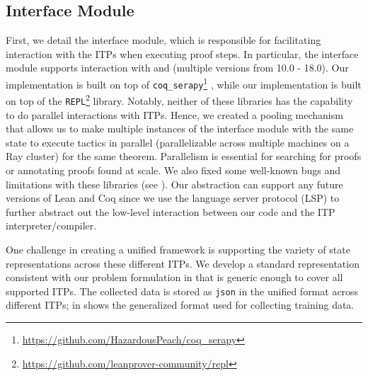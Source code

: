 \subsection{Interface Module}
\label{sec:interface-module}
First, we detail the interface module, which is responsible for facilitating interaction with the ITPs when executing proof steps. In particular, the interface module supports interaction with \lean{} and \coq\;(multiple versions from 10.0 - 18.0). Our \coq\; implementation is built on top of \texttt{coq\_serapy}\footnote{\href{https://github.com/HazardousPeach/coq\_serapy}{https://github.com/HazardousPeach/coq\_serapy}} \citep{sanchez2020generating}, while our \lean{} implementation is built on top of the \texttt{REPL}\footnote{\href{https://github.com/leanprover-community/repl}{https://github.com/leanprover-community/repl}} library. Notably, neither of these libraries has the capability to do parallel interactions with ITPs. Hence, we created a pooling mechanism that allows us to make multiple instances of the interface module with the same state to execute tactics in parallel (parallelizable across multiple machines on a Ray cluster) for the same theorem. Parallelism is essential for searching for proofs or annotating proofs found at scale. We also fixed some well-known bugs and limitations with these libraries (see ). Our abstraction can support any future versions of Lean and Coq since we use the language server protocol (LSP) to further abstract out the low-level interaction between our code and the ITP interpreter/compiler.

One challenge in creating a unified framework is supporting the variety of state representations across these different ITPs. 
We develop a standard representation consistent with our problem formulation in  that is generic enough to cover all supported ITPs.  The collected data is stored as \texttt{json} in the unified format across different ITPs;  in  shows the generalized format used for collecting training data.

